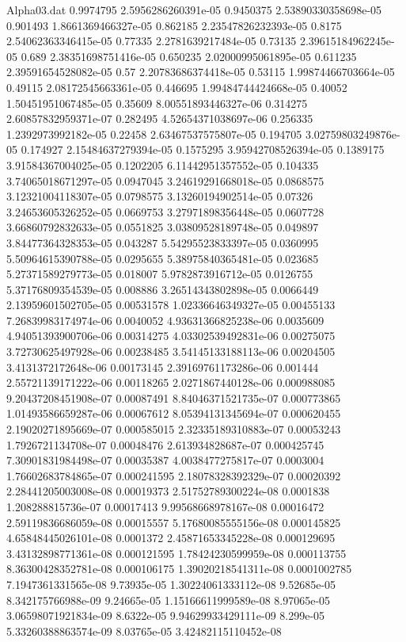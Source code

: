 \begin{filecontents}{Alpha03.dat}
0.9974795	2.5956286260391e-05
0.9450375	2.53890330358698e-05
0.901493	1.8661369466327e-05
0.862185	2.23547826232393e-05
0.8175	2.54062363346415e-05
0.77335	2.2781639217484e-05
0.73135	2.39615184962245e-05
0.689	2.38351698751416e-05
0.650235	2.02000995061895e-05
0.611235	2.39591654528082e-05
0.57	2.20783686374418e-05
0.53115	1.99874466703664e-05
0.49115	2.08172545663361e-05
0.446695	1.99484744424668e-05
0.40052	1.50451951067485e-05
0.35609	8.00551893446327e-06
0.314275	2.60857832959371e-07
0.282495	4.52654371038697e-06
0.256335	1.2392973992182e-05
0.22458	2.63467537575807e-05
0.194705	3.02759803249876e-05
0.174927	2.15484637279394e-05
0.1575295	3.95942708526394e-05
0.1389175	3.91584367004025e-05
0.1202205	6.11442951357552e-05
0.104335	3.74065018671297e-05
0.0947045	3.24619291668018e-05
0.0868575	3.12321004118307e-05
0.0798575	3.13260194902514e-05
0.07326	3.24653605326252e-05
0.0669753	3.27971898356448e-05
0.0607728	3.66860792832633e-05
0.0551825	3.03809528189748e-05
0.049897	3.84477364328353e-05
0.043287	5.54295523833397e-05
0.0360995	5.50964615390788e-05
0.0295655	5.38975840365481e-05
0.023685	5.27371589279773e-05
0.018007	5.9782873916712e-05
0.0126755	5.37176809354539e-05
0.008886	3.26514343802898e-05
0.0066449	2.13959601502705e-05
0.00531578	1.02336646349327e-05
0.00455133	7.26839983174974e-06
0.0040052	4.93631366825238e-06
0.0035609	4.94051393900706e-06
0.00314275	4.03302539492831e-06
0.00275075	3.72730625497928e-06
0.00238485	3.54145133188113e-06
0.00204505	3.4131372172648e-06
0.00173145	2.39169761173286e-06
0.001444	2.55721139171222e-06
0.00118265	2.0271867440128e-06
0.000988085	9.20437208451908e-07
0.00087491	8.84046371521735e-07
0.000773865	1.01493586659287e-06
0.00067612	8.05394131345694e-07
0.000620455	2.19020271895669e-07
0.000585015	2.32335189310883e-07
0.00053243	1.7926721134708e-07
0.00048476	2.613934828687e-07
0.000425745	7.30901831984498e-07
0.00035387	4.0038477275817e-07
0.0003004	1.76602683784865e-07
0.000241595	2.18078328392329e-07
0.00020392	2.28441205003008e-08
0.00019373	2.51752789300224e-08
0.0001838	1.208288815736e-07
0.00017413	9.99568668978167e-08
0.00016472	2.59119836686059e-08
0.00015557	5.17680085555156e-08
0.000145825	4.65848445026101e-08
0.0001372	2.45871653345228e-08
0.000129695	3.43132898771361e-08
0.000121595	1.78424230599959e-08
0.000113755	8.36300428352781e-08
0.000106175	1.39020218541311e-08
0.0001002785	7.1947361331565e-08
9.73935e-05	1.30224061333112e-08
9.52685e-05	8.342175766988e-09
9.24665e-05	1.15166611999589e-08
8.97065e-05	3.06598071921834e-09
8.6322e-05	9.94629933429111e-09
8.299e-05	5.33260388863574e-09
8.03765e-05	3.42482115110452e-08

\end{filecontents}
